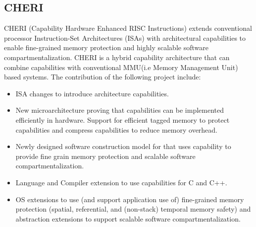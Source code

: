 




\subsection{CHERI \cite{CHERI}}
CHERI (Capability Hardware Enhanced RISC Instructions) extends conventional processor
Instruction-Set Architectures (ISAs) with architectural capabilities to enable fine-grained
memory protection and highly scalable software compartmentalization. CHERI is a hybrid 
capability architecture that can combine capabilities with conventional MMU(i.e Memory Management
 Unit) based systems. The contribution of the following project include: 
\begin{itemize}
  \item ISA changes to introduce architecture capabilities.
  \item New microarchitecture proving that capabilities can be implemented efficiently 
        in hardware. Support for efficient tagged memory to protect capabilities and
        compress capabilities to reduce memory overhead.   
  \item Newly designed software construction model for that uses capability to provide
        fine grain memory protection and scalable software compartmentalization.  
  \item Language and Compiler extension to use capabilities for C and C++.
  \item OS extensions to use (and support application use of) fine-grained memory protection
        (spatial, referential, and (non-stack) temporal memory safety) and abstraction extensions
        to support scalable software compartmentalization. 
\end{itemize}
	

